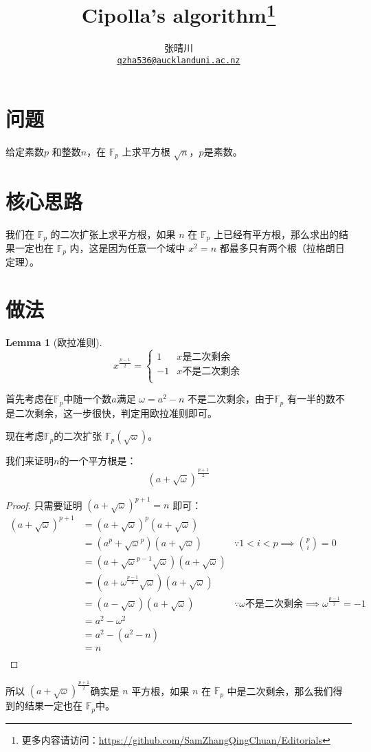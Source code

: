 \documentclass{article}
\title{Cipolla's algorithm\footnote{更多内容请访问：\url{https://github.com/SamZhangQingChuan/Editorials}}}
\author{张晴川\\\href{mailto:qzha536@aucklanduni.ac.nz}{\texttt{qzha536@aucklanduni.ac.nz}}}
\newtheorem*{lemma*}{Lemma}
\begin{document}
\maketitle

\section{问题}
\begin{center}
给定素数$p$ 和整数$n$，在 $\mathbb{F}_p$ 上求平方根 $\sqrt{n}$，$p$是素数。
\end{center}
\section{核心思路}
我们在 $\mathbb{F}_p$ 的二次扩张上求平方根，如果 $n$ 在 $\mathbb{F}_p$ 上已经有平方根，那么求出的结果一定也在 $\mathbb{F}_p$ 内，这是因为任意一个域中 $x^2 = n$ 都最多只有两个根（拉格朗日定理）。

\section{做法}


\begin{lemma*}[欧拉准则]
    $$
        x^{\frac{p-1}{2}} = 
            \begin{cases}
                1 & x\text{是二次剩余} \\
                -1 & x\text{不是二次剩余} \\
            \end{cases}
    $$
\end{lemma*}
首先考虑在$\mathbb{F}_p$中随一个数$a$满足 $\omega = a^2 - n$ 不是二次剩余，由于$\mathbb{F}_p$ 有一半的数不是二次剩余，这一步很快，判定用欧拉准则即可。

\newpage
现在考虑$\mathbb{F}_p$的二次扩张 $\mathbb{F}_p(\sqrt{\omega})$。

我们来证明$n$的一个平方根是：
$$
    (a+\sqrt{\omega})^{\frac{p+1}{2}}
$$

\begin{proof}
只需要证明 $(a+\sqrt{\omega})^{p+1} = n$ 即可：
\begin{align*}
    (a+\sqrt{\omega})^{p+1}
    &= (a+\sqrt{\omega})^{p}(a+\sqrt{\omega})\\
    &= (a^p+\sqrt{\omega}^p)(a+\sqrt{\omega}) &  \because 1< i<p \implies \binom{p}{i} = 0\\
    &= (a+\sqrt{\omega}^{p-1}\sqrt{\omega})(a+\sqrt{\omega}) \\
    &= (a+\omega^{\frac{p-1}{2}}\sqrt{\omega})(a+\sqrt{\omega}) \\
    &= (a-\sqrt{\omega})(a+\sqrt{\omega})&  \because \omega \text{不是二次剩余} \implies \omega^{\frac{p-1}{2}} = -1 \\
    &= a^2-\omega ^2 \\
    &= a^2-(a^2-n) \\
    &= n \\
\end{align*}
\end{proof}

所以 $(a+\sqrt{\omega})^{\frac{p+1}{2}}$确实是 $n$ 平方根，如果 $n$ 在 $\mathbb{F}_p$ 中是二次剩余，那么我们得到的结果一定也在 $\mathbb{F}_p$中。
\end{document}
